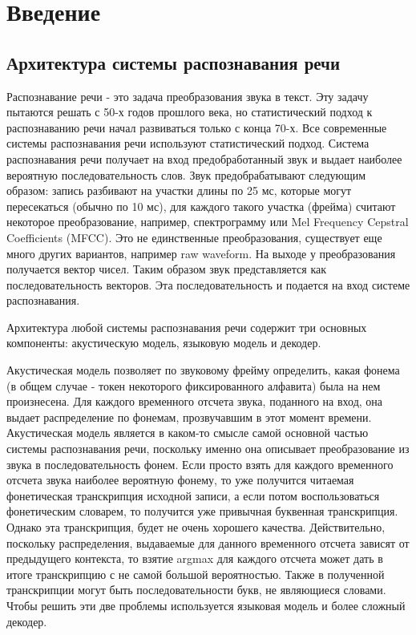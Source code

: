 \documentclass[a4paper,14pt]{extarticle}
\begin{document}
\section{Введение}
\subsection{Архитектура системы распознавания речи}
Распознавание речи - это задача преобразования звука в текст. Эту задачу пытаются решать с 50-х годов прошлого века, но статистический подход к распознаванию речи начал развиваться только с конца 70-х. Все современные системы распознавания речи используют статистический подход.
Система распознавания речи получает на вход предобработанный звук и выдает наиболее вероятную последовательность слов. Звук предобрабатывают следующим образом: запись разбивают на участки длины по 25 мс, которые могут пересекаться (обычно по 10 мс), для каждого такого участка (фрейма) считают некоторое преобразование, например, спектрограмму или Mel Frequency Cepstral Coefficients (MFCC). Это не единственные преобразования, существует еще много других вариантов, например raw waveform. На выходе у преобразования получается вектор чисел. Таким образом звук представляется как последовательность векторов. Эта последовательность и подается на вход системе распознавания.

Архитектура любой системы распознавания речи содержит три основных компоненты: акустическую модель, языковую модель и декодер.

Акустическая модель позволяет по звуковому фрейму определить, какая фонема (в общем случае - токен некоторого фиксированного алфавита) была на нем произнесена. Для каждого временного отсчета звука, поданного на вход, она выдает распределение по фонемам, прозвучавшим в этот момент времени. Акустическая модель является в каком-то смысле самой основной частью системы распознавания речи, поскольку именно она описывает преобразование из звука в последовательность фонем.   Если просто взять для каждого временного отсчета звука наиболее вероятную фонему, то уже получится читаемая фонетическая транскрипция исходной записи, а если потом воспользоваться фонетическим словарем, то получится уже привычная буквенная транскрипция. Однако эта транскрипция, будет не очень хорошего качества. Действительно, поскольку распределения, выдаваемые для данного временного отсчета зависят от предыдущего контекста, то взятие argmax для каждого отсчета может дать в итоге транскрипцию с не самой большой вероятностью. Также в полученной транскрипции могут быть последовательности букв, не являющиеся словами. Чтобы решить эти две проблемы используется языковая модель и более сложный декодер.
\end{document}
